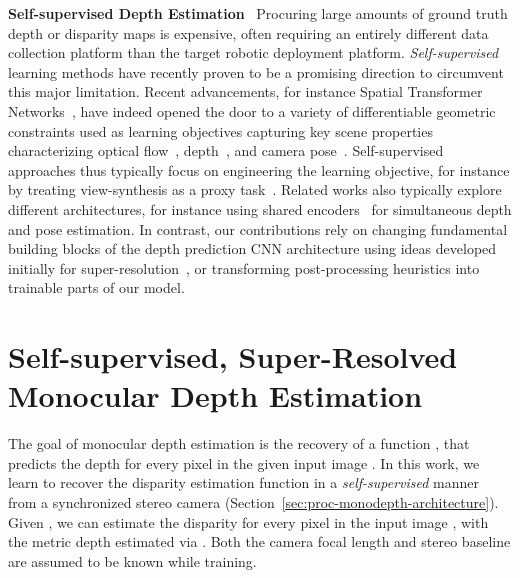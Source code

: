 \documentclass[letterpaper, 10 pt, conference]{ieeeconf}  \IEEEoverridecommandlockouts
\begin{document}
\textbf{Self-supervised Depth Estimation}~
Procuring large amounts of ground truth depth or disparity maps is expensive, often requiring an entirely different data collection platform than the target robotic deployment platform.
\textit{Self-supervised} learning methods have recently proven to be a promising direction to circumvent this major limitation.
Recent advancements, for instance Spatial Transformer Networks~\cite{jaderberg2015spatial}, have indeed opened the door to a variety of differentiable geometric constraints used as learning objectives capturing key scene properties characterizing optical flow~\cite{yin2018geonet,meister2017unflow}, depth~\cite{godard2017unsupervised,garg2016unsupervised,li2017undeepvo,mahjourian2018unsupervised}, and camera pose~\cite{zhou2017unsupervised,li2017undeepvo}.
Self-supervised approaches thus typically focus on engineering the learning objective, for instance by treating view-synthesis as a proxy task~\cite{zhou2016view,flynn2016deepstereo,godard2017unsupervised,godard2018digging,li2017undeepvo,fei2018geo}.
Related works also typically explore different architectures, for instance using shared encoders~\cite{godard2018digging} for simultaneous depth and pose estimation.
In contrast, our contributions rely on changing fundamental building blocks of the depth prediction CNN architecture using ideas developed initially for super-resolution~\cite{shi2016real}, or transforming post-processing heuristics into trainable parts of our model.









%
 \newpage
\section{Self-supervised, Super-Resolved Monocular Depth Estimation}
\label{sec:procedure}

The goal of monocular depth estimation is the recovery of a function , that predicts the depth  for every pixel  in the given input image . In this work, we learn to recover the disparity estimation function  in a \textit{self-supervised} manner from a synchronized stereo camera (Section~\ref{sec:proc-monodepth-architecture}). Given , we can  estimate the disparity  for every pixel  in the input image , with the metric depth  estimated via . Both the camera focal length  and stereo baseline  are assumed to be known while training. 
\end{document}
